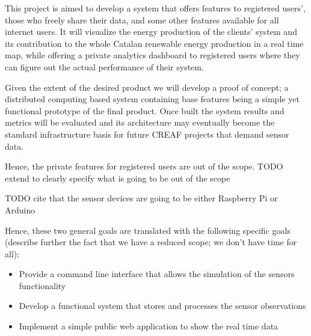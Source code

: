This project is aimed to develop a system that offers features to registered users’, those who freely share their data, and some other features available for all internet users. It will visualize the energy production of the clients’ system and its contribution to the whole Catalan renewable energy production in a real time map, while offering a private analytics dashboard to registered users where they can figure out the actual performance of their system.

Given the extent of the desired product we will develop a proof of concept; a distributed computing based system containing base features being a simple yet functional prototype of the final product. Once built the system results and metrics will be evaluated and its architecture may eventually become the standard infrastructure basis for future CREAF projects that demand sensor data.

Hence, the private features for registered users are out of the scope. TODO extend to clearly specify what is going to be out of the scope

TODO cite that the sensor devices are going to be either Raspberry Pi or Arduino

Hence, these two general goals are translated with the following specific goals (describe further the fact that we have a reduced scope; we don't have time for all):

\begin{itemize}
	\item Provide a command line interface that allows the simulation of the sensors functionality
	\item Develop a functional system that stores and processes the sensor observations
	\item Implement a simple public web application to show the real time data
\end{itemize}

